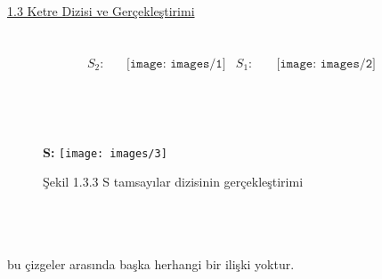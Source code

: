 \documentclass[11pt]{amsbook}
\begin{document}
\underline{1.3 Ketre Dizisi ve Gerçekleştirimi \hspace*{70ex} }\\ \\ \\
\begin{align*}
 S_2: & \ \ \ \ \texttt{[image: images/1]}& S_1:& \quad  \texttt{[image: images/2]}\\
\end{align*}
\\ \\ \\
\begin{figure}[htb]
    \textbf{S:}
	\texttt{[image: images/3]}
	\caption*{ Şekil 1.3.3 S tamsayılar dizisinin gerçekleştirimi }
	\label{fig:Bb}
\end{figure}\\ \\ \\
bu çizgeler arasında başka herhangi bir ilişki yoktur.
\end{document}
